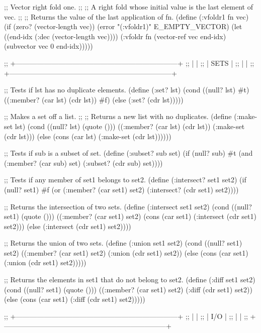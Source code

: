 ;; Vector right fold one.
;;
;; A right fold whose initial value is the last element of vec.
;;
;; Returns the value of the last application of fn.
(define (:vfoldr1 fn vec)
  (if (zero? (vector-length vec))
    (error "(:vfoldr1)" E_EMPTY_VECTOR)
    (let ((end-idx (:dec (vector-length vec))))
      (:vfoldr fn (vector-ref vec end-idx) (subvector vec 0 end-idx)))))


;; +---------------------------------------------------------------------+
;; |                                                                     |
;; |                              SETS                                   |
;; |                                                                     |
;; +---------------------------------------------------------------------+


;; Tests if lst has no duplicate elements.
(define (:set? lst)
  (cond ((null? lst) #t)
        ((:member? (car lst) (cdr lst)) #f)
        (else (:set? (cdr lst)))))


;; Makes a set off a list.
;;
;; Returns a new list with no duplicates.
(define (:make-set lst)
  (cond ((null? lst) (quote ()))
        ((:member? (car lst) (cdr lst)) (:make-set (cdr lst)))
        (else (cons (car lst) (:make-set (cdr lst))))))


;; Tests if sub is a subset of set.
(define (:subset? sub set)
  (if (null? sub) 
    #t
    (and (:member? (car sub) set) 
         (:subset? (cdr sub) set))))


;; Tests if any member of set1 belongs to set2.
(define (:intersect? set1 set2)
  (if (null? set1)
    #f
    (or (:member? (car set1) set2)
        (:intersect? (cdr set1) set2))))


;; Returns the intersection of two sets.
(define (:intersect set1 set2)
  (cond ((null? set1) (quote ()))
        ((:member? (car set1) set2) (cons (car set1) (:intersect (cdr set1) set2)))
        (else (:intersect (cdr set1) set2))))


;; Returns the union of two sets.
(define (:union set1 set2)
  (cond ((null? set1) set2)
        ((:member? (car set1) set2) (:union (cdr set1) set2))
        (else (cons (car set1) (:union (cdr set1) set2)))))


;; Returns the elements in set1 that do not belong to set2.
(define (:diff set1 set2)
  (cond ((null? set1) (quote ()))
        ((:member? (car set1) set2) (:diff (cdr set1) set2))
        (else (cons (car set1) (:diff (cdr set1) set2)))))


;; +---------------------------------------------------------------------+
;; |                                                                     |
;; |                              I/O                                    |
;; |                                                                     |
;; +---------------------------------------------------------------------+


